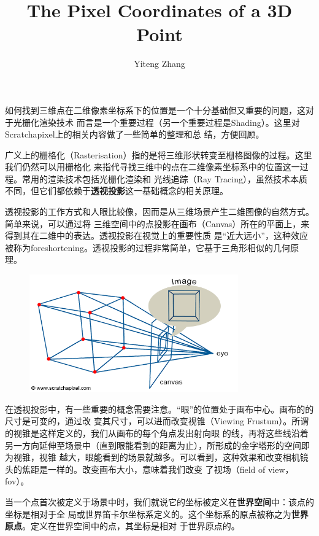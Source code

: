 \documentclass[12pt]{article}
\title{The Pixel Coordinates of a 3D Point}
\author{Yiteng Zhang}
\begin{document}
\maketitle

\indent{}如何找到三维点在二维像素坐标系下的位置是一个十分基础但又重要的问题，这对于光栅化渲染技术
而言是一个重要过程（另一个重要过程是Shading）。这里对Scratchapixel上的相关内容做了一些简单的整理和总
结，方便回顾。

\indent{}广义上的栅格化（Rasterisation）指的是将三维形状转变至栅格图像的过程。这里我们仍然可以用栅格化
来指代寻找三维中的点在二维像素坐标系中的位置这一过程。常用的渲染技术包括光栅化渲染和
光线追踪（Ray Tracing），虽然技术本质不同，但它们都依赖于\textbf{透视投影}这一基础概念的相关原理。

\indent{}透视投影的工作方式和人眼比较像，因而是从三维场景产生二维图像的自然方式。简单来说，可以通过将
三维空间中的点投影在画布（Canvas）所在的平面上，来得到其在二维中的表达。透视投影在视觉上的重要性质
是“近大远小”，这种效应被称为foreshortening。透视投影的过程非常简单，它基于三角形相似的几何原理。

\begin{figure}[h]
\centering
\includegraphics[width=9cm]{./imgs/perspective4.png}
\end{figure}

\indent{}在透视投影中，有一些重要的概念需要注意。“眼”的位置处于画布中心。画布的的尺寸是可变的，通过改
变其尺寸，可以进而改变视锥（Viewing Frustum）。所谓的视锥是这样定义的，我们从画布的每个角点发出射向眼
的线，再将这些线沿着另一方向延伸至场景中（直到眼能看到的距离为止），所形成的金字塔形的空间即为视锥，视锥
越大，眼能看到的场景就越多。可以看到，这种效果和改变相机镜头的焦距是一样的。改变画布大小，意味着我们改变
了视场（field of view，fov）。

\indent{}当一个点首次被定义于场景中时，我们就说它的坐标被定义在\textbf{世界空间}中：该点的坐标是相对于全
局或世界笛卡尔坐标系定义的。这个坐标系的原点被称之为\textbf{世界原点}。定义在世界空间中的点，其坐标是相对
于世界原点的。
\end{document}
